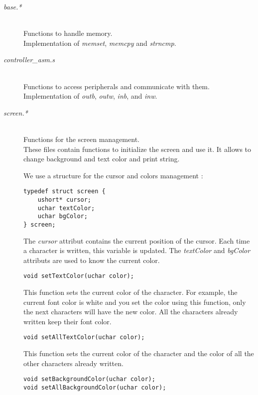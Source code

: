 \documentclass[a4paper]{article}
\begin{document}
\begin{description}
\item[\textit{base.*}] \hfill \\
Functions to handle memory.\\
Implementation of \textit{memset}, \textit{memcpy} and \textit{strncmp}.

\item[\textit{controller\_asm.s}] \hfill \\
Functions to access peripherals and communicate with them.\\
Implementation of \textit{outb}, \textit{outw}, \textit{inb}, and \textit{inw}.

\item[\textit{screen.*}] \hfill \\
Functions for the screen management.\\
These files contain functions to initialize the screen and use it. It allows to change background and text color and print string.

We use a structure for the cursor and colors management :

\begin{verbatim}
typedef struct screen {
    ushort* cursor;
    uchar textColor;
    uchar bgColor;
} screen;
\end{verbatim}

The \textit{cursor} attribut contains the current position of the cursor.
Each time a character is written, this variable is updated.
The \textit{textColor} and \textit{bgColor} attributs are used to know the current color. 

\begin{verbatim}
void setTextColor(uchar color);
\end{verbatim}

This function sets the current color of the character. For example, the current font color is white and you set the color using this function, only the next characters will have the new color. All the characters already written keep their font color.  

\begin{verbatim}
void setAllTextColor(uchar color);
\end{verbatim}

This function sets the current color of the character and the color of all the other characters already written.

\begin{verbatim}
void setBackgroundColor(uchar color);
void setAllBackgroundColor(uchar color);
\end{verbatim}


\end{description}
\end{document}
